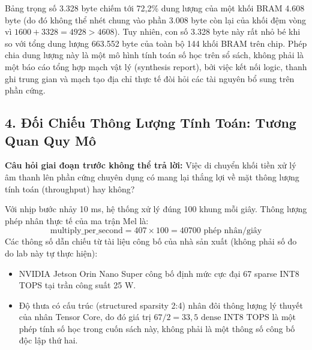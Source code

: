 \documentclass[11pt,a4paper]{article}
\begin{document}
\begin{physicalinsight}
Bảng trọng số 3.328 byte chiếm tới 72,2\% dung lượng của một khối BRAM 4.608 byte (do đó không thể nhét chung vào phần 3.008 byte còn lại của khối đệm vòng vì $1600 + 3328 = 4928 > 4608$). Tuy nhiên, con số 3.328 byte này rất nhỏ bé khi so với tổng dung lượng 663.552 byte của toàn bộ 144 khối BRAM trên chip. Phép chia dung lượng này là một mô hình tính toán số học trên sổ sách, không phải là một báo cáo tổng hợp mạch vật lý (synthesis report), bởi việc kết nối logic, thanh ghi trung gian và mạch tạo địa chỉ thực tế đòi hỏi các tài nguyên bổ sung trên phần cứng.
\end{physicalinsight}

\clearpage


\subsection*{4. Đối Chiếu Thông Lượng Tính Toán: Tương Quan Quy Mô}

\textbf{Câu hỏi giai đoạn trước không thể trả lời:} Việc di chuyển khối tiền xử lý âm thanh lên phần cứng chuyên dụng có mang lại thắng lợi về mặt thông lượng tính toán (throughput) hay không?

Với nhịp bước nhảy 10 ms, hệ thống xử lý đúng 100 khung mỗi giây. Thông lượng phép nhân thực tế của ma trận Mel là:
\[
\text{multiply\_per\_second} = 407 \times 100 = 40700\text{ phép nhân/giây}
\]
Các thông số dẫn chiếu từ tài liệu công bố của nhà sản xuất (không phải số đo do lab này tự thực hiện):
\begin{itemize}
    \item NVIDIA Jetson Orin Nano Super công bố định mức cực đại 67 sparse INT8 TOPS tại trần công suất 25 W.
    \item Độ thưa có cấu trúc (structured sparsity 2:4) nhân đôi thông lượng lý thuyết của nhân Tensor Core, do đó giá trị $67 / 2 = 33{,}5\text{ dense INT8 TOPS}$ là một phép tính số học trong cuốn sách này, không phải là một thông số công bố độc lập thứ hai.
\end{itemize}
\end{document}
